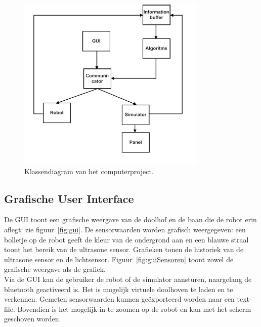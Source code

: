 \documentclass[eind]{penoverslag}
\begin{document}
\begin{figure}[tbp]
\begin{center}
    \includegraphics[width=0.8\textwidth]{Klassendiagram}
    \caption{Klassendiagram van het computerproject.}
    \label{fig:klasDia}
\end{center}
\end{figure}

\subsection{Grafische User Interface} %
\label{ssec:GUI}
De GUI toont een grafische weergave van de doolhof en de baan die de robot erin aflegt: zie figuur~\ref{fig:gui}. De sensorwaarden worden grafisch weergegeven: een bolletje op de robot geeft de kleur van de ondergrond aan en een blauwe straal toont het bereik van de ultrasone sensor. Grafieken tonen de historiek van de ultrasone sensor en de lichtsensor. Figuur~\ref{fig:guiSensoren} toont zowel de grafische weergave als de grafiek. \\

Via de GUI kan de gebruiker de robot of de simulator aansturen, naargelang de bluetooth geactiveerd is. Het is mogelijk virtuele doolhoven te laden en te verkennen. Gemeten sensorwaarden kunnen ge\"exporteerd worden naar een text-file. Bovendien is het mogelijk in te zoomen op de robot en kan met het scherm geschoven worden.
\end{document}
